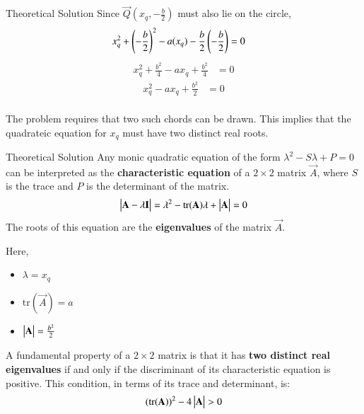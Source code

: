 \documentclass{beamer}
\begin{document}
\begin{frame}{Theoretical Solution}
Since $\vec{Q}(x_q, -\frac{b}{2})$ must also lie on the circle,
\begin{align}
    x_q^2 + \left(-\frac{b}{2}\right)^2 - a(x_q) - \frac{b}{2}\left(-\frac{b}{2}\right) &= 0
\end{align}
\begin{align}
    x_q^2 + \frac{b^2}{4} - ax_q + \frac{b^2}{4} &= 0
\end{align}
\begin{align}
    x_q^2 - ax_q + \frac{b^2}{2} &= 0
\end{align}\\

The problem requires that two such chords can be drawn. This implies that the quadrateic equation for $x_q$ must have two distinct real roots.\\

\end{frame}

\begin{frame}{Theoretical Solution}
Any monic quadratic equation of the form $\lambda^2 - S\lambda + P = 0$ can be interpreted as the \textbf{characteristic equation} of a $2 \times 2$ matrix $\vec{A}$, where $S$ is the trace and $P$ is the determinant of the matrix.
\begin{align}
\begin{vmatrix}\mathbf{A} - \lambda \mathbf{I}\end{vmatrix} = \lambda^2 - \text{tr}(\mathbf{A})\lambda + \begin{vmatrix}\mathbf{A}\end{vmatrix} = 0
\end{align}
The roots of this equation are the \textbf{eigenvalues} of the matrix $\vec{A}$.

Here,
\begin{itemize}
    \item  $\lambda = x_q$
    \item  $\text{tr}(\vec{A}) = a$
    \item  $\begin{vmatrix}\mathbf{A}\end{vmatrix} = \frac{b^2}{2}$
\end{itemize}
A fundamental property of a $2 \times 2$ matrix is that it has \textbf{two distinct real eigenvalues} if and only if the discriminant of its characteristic equation is positive. This condition, in terms of its trace and determinant, is:
\begin{align}
(\text{tr}(\mathbf{A}))^2 - 4\begin{vmatrix}\mathbf{A}\end{vmatrix} > 0
\end{align}\\
\end{frame}
\end{document}
